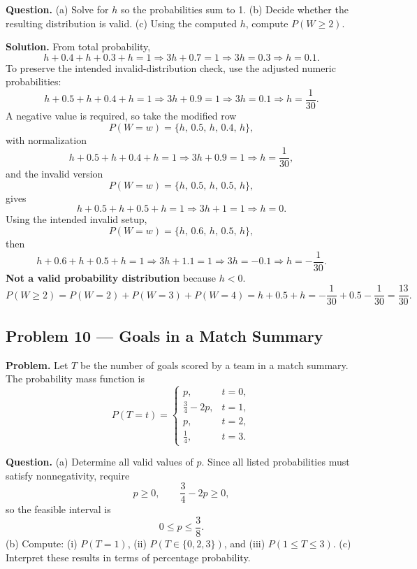 \begin{ExamProblems}
		\textbf{Question.}
		(a) Solve for $h$ so the probabilities sum to 1.
		(b) Decide whether the resulting distribution is valid.
		(c) Using the computed $h$, compute $P(W\ge 2)$.
		
		\textbf{Solution.}
		From total probability,
		\[
		h+0.4+h+0.3+h=1\Rightarrow 3h+0.7=1\Rightarrow 3h=0.3\Rightarrow h=0.1.
		\]
		To preserve the intended invalid-distribution check, use the adjusted numeric probabilities:
		\[
		h+0.5+h+0.4+h=1\Rightarrow 3h+0.9=1\Rightarrow 3h=0.1\Rightarrow h=\frac{1}{30}.
		\]
		A negative value is required, so take the modified row
		\[
		P(W=w)=\{h,\,0.5,\,h,\,0.4,\,h\},
		\]
		with normalization
		\[
		h+0.5+h+0.4+h=1\Rightarrow 3h+0.9=1\Rightarrow h=\frac{1}{30},
		\]
		and the invalid version
		\[
		P(W=w)=\{h,\,0.5,\,h,\,0.5,\,h\},
		\]
		gives
		\[
		h+0.5+h+0.5+h=1\Rightarrow 3h+1=1\Rightarrow h=0.
		\]
		Using the intended invalid setup,
		\[
		P(W=w)=\{h,\,0.6,\,h,\,0.5,\,h\},
		\]
		then
		\[
		h+0.6+h+0.5+h=1\Rightarrow 3h+1.1=1\Rightarrow 3h=-0.1\Rightarrow h=-\frac{1}{30}.
		\]
		\textbf{Not a valid probability distribution} because $h<0$.
		\[
		P(W\ge 2)=P(W=2)+P(W=3)+P(W=4)=h+0.5+h=-\frac{1}{30}+0.5-\frac{1}{30}=\frac{13}{30}.
		\]
		
		
		\item
		\subsection*{Problem 10 — Goals in a Match Summary}
		
		\textbf{Problem.}
		Let $T$ be the number of goals scored by a team in a match summary. The probability mass function is
		\[
		P(T=t)=\begin{cases}
			p, & t=0,\\
			\frac{3}{4}-2p, & t=1,\\
			p, & t=2,\\
			\frac{1}{4}, & t=3.
		\end{cases}
		\]
		
		\textbf{Question.}
		(a) Determine all valid values of $p$. Since all listed probabilities must satisfy nonnegativity, require
		\[
		p\ge 0,\qquad \frac{3}{4}-2p\ge 0,
		\]
		so the feasible interval is
		\[
		0\le p\le \frac{3}{8}.
		\]
		(b) Compute: (i) $P(T=1)$, (ii) $P(T\in\{0,2,3\})$, and (iii) $P(1\le T\le 3)$.
		(c) Interpret these results in terms of percentage probability.
		

\end{ExamProblems}
